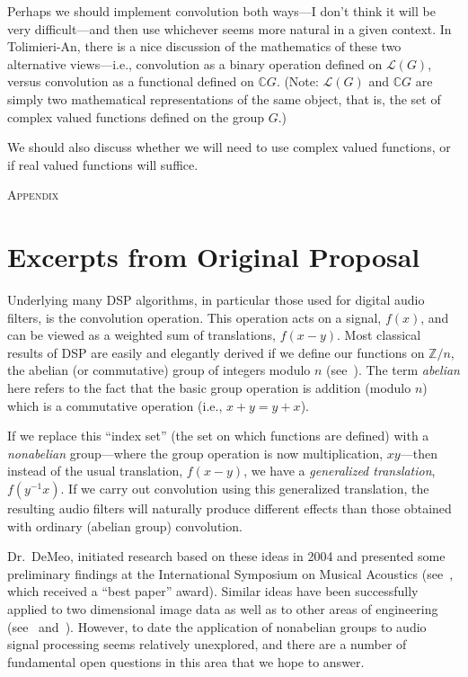 \documentclass[11pt]{article}
\newcommand\C{\ensuremath{\mathbb{C}}}
\newcommand\sL{\ensuremath{\mathcal{L}}}
\begin{document}
Perhaps we should implement convolution both ways---I don't think it will be
very difficult---and then use whichever seems more natural in a given context.
In Tolimieri-An, there is a nice discussion of the mathematics of these two
alternative views---i.e., convolution as a binary operation defined on $\sL(G)$, versus convolution
as a functional defined on $\C G$. (Note: 
$\sL(G)$ and $\C G$ are simply two mathematical representations of the
same object, that is, the set of complex valued functions defined on the group
$G$.)

We should also discuss whether we will need to use complex valued functions, or if
real valued functions will suffice.


\newpage

\appendix

\begin{center}
  \textsc{Appendix}
\end{center}
\section{Excerpts from Original Proposal}

Underlying many \ac{DSP} algorithms, in particular those
used for digital audio filters, is the convolution operation.  This operation
acts on a signal, $f(x)$, and can be viewed as a weighted sum of translations,
$f(x-y)$. Most classical results of \ac{DSP} are easily and elegantly derived if we
define our functions on $\mathbb{Z}/n$, the abelian (or commutative) group of
integers modulo $n$ (see~\cite{Tolimieri:1998}).
  The term \emph{abelian} here refers to the fact that the basic
group operation is addition (modulo $n$) which is a commutative operation (i.e.,
$x+y = y+x$).

If we replace this ``index set'' (the set on which functions are defined) with a
\emph{nonabelian} group---where the group operation is now multiplication,
$xy$---then instead of the usual translation, $f(x-y)$, we have a
\emph{generalized translation}, $f(y^{-1}x)$. 
If we carry out convolution using this generalized translation, the
resulting audio filters will naturally produce different effects than those
obtained with ordinary (abelian group) convolution.  


Dr.~DeMeo, initiated research based on these ideas in
2004 and presented some preliminary findings at the International Symposium on Musical
Acoustics (see~\cite{nonabeliandsp}, which received a ``best paper'' award).
Similar ideas have been successfully applied to two dimensional image data
as well as to other areas of engineering (see~\cite{Chirikjian:2002}
and~\cite{Tolimieri:2003}).  However, to date the application of 
nonabelian groups to audio signal processing seems relatively unexplored, and
there are a number of fundamental open questions in this area that we hope to
answer.  
 
\end{document}
